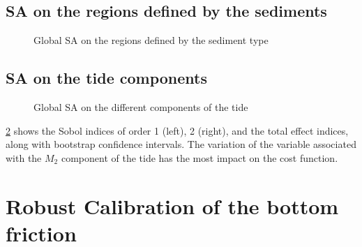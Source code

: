 \documentclass[../../Main_ManuscritThese.tex]{subfiles}
\newcommand\imgpath{/home/victor/acadwriting/Manuscrit/Text/Chapter5/img/}
\begin{document}
\subsection{SA on the regions defined by the sediments}
\label{ssec:SA_sediments}
\begin{figure}[ht]
  \centering
  
  \caption{\label{fig:SA_sediments} Global SA on the regions defined by the sediment type}
\end{figure}


\subsection{SA on the tide components}
\label{ssec:SA_tide}
\begin{figure}[ht]
  \centering
  
  \caption{\label{fig:SA_tides} Global SA on the different components of the tide }
\end{figure}

\cref{fig:SA_tides} shows the Sobol indices of order 1 (left), 2
(right), and the total effect indices, along with bootstrap confidence
intervals. The variation of the variable associated with the $M_2$
component of the tide has the most impact on the cost function.



\section{Robust Calibration of the bottom friction}

%   

%   







\subfileLocal{
	\pagestyle{empty}
	
	
}
\end{document}
